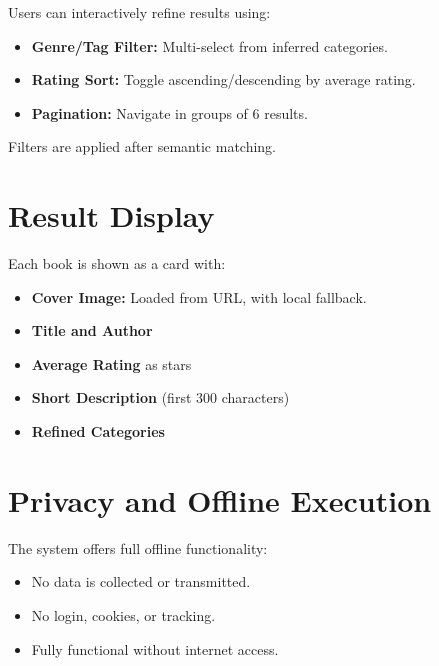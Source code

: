 Users can interactively refine results using:

\begin{itemize}
    \item \textbf{Genre/Tag Filter:} Multi-select from inferred categories.
    \item \textbf{Rating Sort:} Toggle ascending/descending by average rating.
    \item \textbf{Pagination:} Navigate in groups of 6 results.
\end{itemize}

Filters are applied after semantic matching.

\section{Result Display}
\label{sec:ui-display}

Each book is shown as a card with:

\begin{itemize}
    \item \textbf{Cover Image:} Loaded from URL, with local fallback.
    \item \textbf{Title and Author}
    \item \textbf{Average Rating} as stars
    \item \textbf{Short Description} (first 300 characters)
    \item \textbf{Refined Categories}
\end{itemize}

\section{Privacy and Offline Execution}
\label{sec:ui-privacy}

The system offers full offline functionality:

\begin{itemize}
    \item No data is collected or transmitted.
    \item No login, cookies, or tracking.
    \item Fully functional without internet access.
\end{itemize}